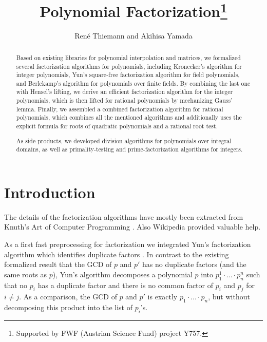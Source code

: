 \documentclass[11pt,a4paper]{article}
\begin{document}
\title{Polynomial Factorization\footnote{Supported by FWF (Austrian Science Fund) project Y757.}}
\author{Ren\'e Thiemann and Akihisa Yamada}
\maketitle

\begin{abstract}
Based on existing libraries for polynomial interpolation and matrices,
we formalized several factorization algorithms for polynomials, including
Kronecker's algorithm for integer polynomials,
Yun's square-free factorization algorithm for field polynomials, and
Berlekamp's algorithm for polynomials over finite fields.
By combining the last one with Hensel's lifting,
we derive an efficient factorization algorithm for the integer polynomials,
which is then lifted for rational polynomials by mechanizing Gauss' lemma.
Finally, we assembled a combined factorization algorithm for rational polynomials,
which combines all the mentioned algorithms and additionally uses the explicit formula for roots 
of quadratic polynomials and a rational root test.

As side products, we developed division algorithms for polynomials over integral domains,
as well as primality-testing and prime-factorization algorithms for integers.
\end{abstract}

\tableofcontents

\section{Introduction}

The details of the factorization algorithms have mostly been extracted 
from Knuth's Art of Computer Programming
\cite{Knuth}. Also Wikipedia provided valuable help.

\medskip
As a first fast
preprocessing for factorization we integrated Yun's factorization algorithm which identifies duplicate
factors \cite{Yun}. In contrast to the existing formalized result that the GCD of $p$ and $p'$ has no
duplicate factors (and the same roots as $p$), Yun's algorithm decomposes a polynomial $p$ into
$p_1^1 \cdot \ldots \cdot p_n^n$ such that no $p_i$ has a duplicate factor and there is no common
factor of $p_i$ and $p_j$ for $i \neq j$. As a comparison, the GCD of $p$ and $p'$ is exactly
$p_1 \cdot \ldots \cdot p_n$, but without decomposing this product into the list of $p_i$'s.
\end{document}
